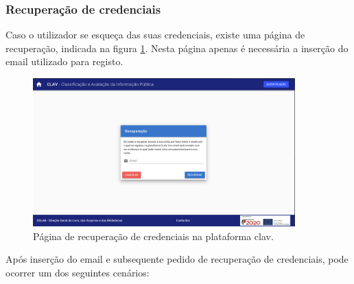 \cleardoublepage
\subsubsection{Recuperação de credenciais}

Caso o utilizador se esqueça das suas credenciais, existe uma página de recuperação, indicada na figura \ref{fig:pagRecuperacao}. Nesta página apenas é necessária a inserção do email utilizado para registo.

\vspace{-3mm}
\begin{figure}[h!]
    \centering
    \includegraphics[width=0.9\textwidth]{img/clav/recuperacao/recuperacao.png}
    \caption{Página de recuperação de credenciais na plataforma \gls{clav}.}
    \label{fig:pagRecuperacao}
\end{figure}

\vspace{-3mm}
Após inserção do email e subsequente pedido de recuperação de credenciais, pode ocorrer um dos seguintes cenários:

